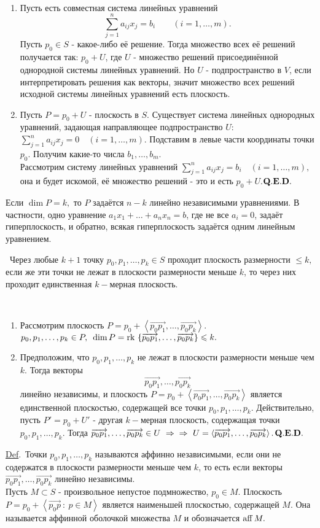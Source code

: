 \documentclass[a4paper]{article}%
\renewcommand{\de}{\par\noindent\underline{Def}.\ }%
\newcommand{\te}{\par\noindent{\bf Теорема.}\ }%
\newcommand{\dok}{\par\noindent{\textsl{Доказательство}.}\ }%
\newcommand{\qed}{\quad${{\bf Q.E.D.}}$}
\newcommand{\lob}[1]{\left\langle#1\right\rangle}%
\newcommand{\rom}[1]{{\rm#1\,}}
\newcommand{\oi}[1]{\overrightarrow{#1}}%
\renewcommand{\le}{\leqslant}
\begin{document}
\dok \begin{enumerate}
    \item Пусть есть совместная система линейных уравнений
    $$
    \sum_{j=1}^na_{ij}x_j=b_i\qquad(i=1,\dots,m).
    $$
    Пусть $p_0\in S$ - какое-либо её решение. Тогда множество всех её решений получается так: $p_0+U$, где
    $U$ - множество решений присоединённой однородной системы линейных уравнений. Но $U$ - подпространство в
    $V$, если интерпретировать решения как векторы, значит множество всех решений исходной системы линейных
    уравнений есть плоскость.
    \item Пусть $P=p_0+U$ - плоскость в $S$. Существует система линейных однородных уравнений, задающая
    направляющее подпространство $U$: $\sum\limits_{j=1}^na_{ij}x_j=0\quad(i=1,\dots,m)$. Подставим в левые части
    координаты точки $p_0.$ Получим какие-то числа $b_1,\dots,b_m.$\\ Рассмотрим систему линейных уравнений
    $\sum\limits_{j=1}^na_{ij}x_j=b_i\quad(i=1,\dots,m),$ она и будет искомой, её множество решений - это и есть $p_0+U.$\qed
\end{enumerate}
Если $\dim P=k,$ то $P$ задаётся $n-k$ линейно независимыми уравнениями. В частности, одно уравнение
$a_1x_1+\dots+a_nx_n=b$, где не все $a_i=0$, задаёт гиперплоскость, и обратно, всякая гиперплоскость задаётся
одним линейным уравнением. %
\te Через любые $k+1$ точку $p_0,p_1,\dots,p_k\in S$ проходит плоскость размерности $\le k,$ если же эти точки не
лежат в плоскости размерности меньше $k$, то через них проходит единственная $k-$мерная плоскость. %
\dok \begin{enumerate}
    \item Рассмотрим плоскость $P=p_0+\lob{\oi{p_0p_1},\dots,\oi{p_0p_k}}$. $p_0,p_1,\dots,p_k\in P,\\\ \dim P=\rom{rk}\left
    \{\oi{p_0p_1},\dots,\oi{p_0p_k}\right\}\le k.$
    \item Предположим, что $p_0,p_1,\dots,p_k$ не лежат в плоскости размерности меньше чем $k$. Тогда векторы
    $$\oi{p_0p_1},\dots,\oi{p_0p_k}$$ линейно независимы, и плоскость $P=p_0+\lob{\oi{p_0p_1},\dots,\oi{p_0p_k}}$
    является единственной плоскостью, содержащей все точки $p_0,p_1,\dots,p_k$. Действительно, пусть $P'=p_0+U'$ -
    другая $k-$мерная плоскость, содержащая точки $p_0,p_1,\dots,p_k$. Тогда $\oi{p_0p_1},\dots,\oi{p_0p_k}\in U\ \Rightarrow\\
    \Rightarrow\ U=\lob{\oi{p_0p_1},\dots,\oi{p_0p_k}}.$\qed
\end{enumerate}
\de Точки $p_0,p_1,\dots,p_k$ называются аффинно независимыми, если они не содержатся в плоскости размерности
меньше чем $k$, то есть если векторы $\oi{p_0p_1},\dots,\oi{p_0p_k}$ линейно независимы.\\%
Пусть $M\subset S$ - произвольное непустое подмножество, $p_0\in M.$ Плоскость $P=p_0+\lob{\oi{p_0p}\ :\ p\in M}$
является наименьшей плоскостью, содержащей $M$. Она называется аффинной оболочкой множества $M$ и
обозначается $\rom{aff}M.$%
\end{document}
